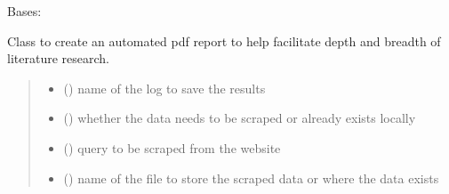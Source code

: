 \documentclass[letterpaper,10pt,english]{sphinxmanual}
\begin{document}
\begin{fulllineitems}
\label{\detokenize{BeeLitReview:BeeLitReview.BeeLitReview}}
\pysigstartsignatures
{}
\pysigstopsignatures
\sphinxAtStartPar
Bases: 

\sphinxAtStartPar
Class to create an automated pdf report to help facilitate depth and breadth of literature research.
\begin{quote}\begin{description}
\begin{itemize}
\item {} 
\sphinxAtStartPar
{} () \textendash{} name of the log to save the results

\item {} 
\sphinxAtStartPar
{} () \textendash{} whether the data needs to be scraped or already exists locally

\item {} 
\sphinxAtStartPar
{} () \textendash{} query to be scraped from the website

\item {} 
\sphinxAtStartPar
{} () \textendash{} name of the file to store the scraped data or where the data exists


\end{itemize}
\end{description}
\end{quote}
\end{fulllineitems}
\end{document}
